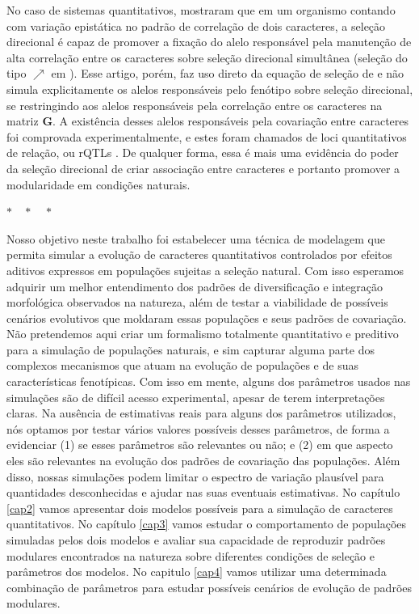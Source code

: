 No caso de sistemas quantitativos, \cite{Pavlicev2010} mostraram que em um
organismo contando com variação epistática no padrão de correlação de dois
caracteres, a seleção direcional é capaz de promover a fixação do alelo
responsável pela manutenção de alta correlação entre os caracteres sobre
seleção direcional simultânea  (seleção do tipo $\nearrow$ em
\cite{Jones2004}).
Esse artigo, porém, faz uso direto da equação de seleção de
\cite{Lande1979} e não simula explicitamente os alelos responsáveis pelo
fenótipo sobre seleção direcional, se restringindo aos alelos
responsáveis pela correlação entre os caracteres na matriz $\mathbf{G}$.
A existência desses alelos responsáveis pela covariação entre caracteres foi
comprovada experimentalmente, e estes foram chamados de loci
quantitativos de relação, ou rQTLs \citep{Pavlicev2008a}.
De qualquer forma, essa é mais uma evidência do poder da seleção
direcional de criar associação entre caracteres e portanto promover a
modularidade em condições naturais.

\centerline { $ * \quad * \quad * $ }

Nosso objetivo neste trabalho foi estabelecer uma técnica de modelagem
que permita simular a evolução de caracteres quantitativos controlados
por efeitos aditivos expressos em populações sujeitas a seleção natural.
Com isso esperamos adquirir um melhor entendimento dos padrões de
diversificação e integração morfológica observados na natureza, além de
testar a viabilidade de possíveis cenários evolutivos que moldaram essas
populações e seus padrões de covariação.
Não pretendemos aqui criar um formalismo totalmente quantitativo e
preditivo para a simulação de populações naturais, e sim capturar alguma
parte dos complexos mecanismos que atuam na evolução de populações e de
suas características fenotípicas.
Com isso em mente, alguns dos parâmetros usados nas simulações são de
difícil acesso experimental, apesar de terem interpretações claras.
Na ausência de estimativas reais para alguns dos parâmetros utilizados,
nós optamos por testar vários valores possíveis desses parâmetros, de
forma a evidenciar (1) se esses parâmetros são relevantes ou não; e (2)
em que aspecto eles são relevantes na evolução dos padrões de covariação
das populações.
Além disso, nossas simulações podem limitar o espectro de variação
plausível para quantidades desconhecidas e ajudar nas suas eventuais
estimativas.
No capítulo \ref{cap2} vamos apresentar dois modelos possíveis para a
simulação de caracteres quantitativos.
No capítulo \ref{cap3} vamos estudar o comportamento de populações
simuladas pelos dois modelos e avaliar sua capacidade de reproduzir
padrões modulares encontrados na natureza sobre diferentes condições de
seleção e parâmetros dos modelos.
No capitulo \ref{cap4} vamos utilizar uma determinada combinação de
parâmetros para estudar possíveis cenários de evolução de padrões
modulares.

